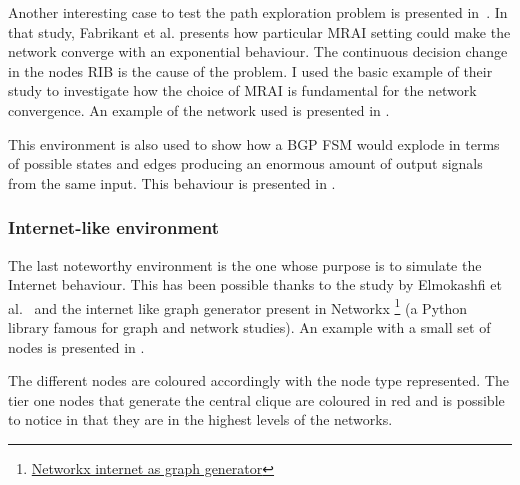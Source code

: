 Another interesting case to test the path exploration problem is 
presented in~\cite{fabrikant2011there}.
In that study, Fabrikant et al. presents how particular \ac{MRAI} setting could
make the network converge with an exponential behaviour. The continuous decision
change in the nodes \ac{RIB} is the cause of the problem.
I used the basic example of their study to investigate how the choice of \ac{MRAI}
is fundamental for the network convergence.
An example of the network used is presented in .


This environment is also used to show how a \ac{BGP} \ac{FSM} would explode
in terms of possible states and edges producing an enormous amount of
output signals from the same input.
This behaviour is presented in .

\subsubsection{Internet-like environment}
\label{subsec:internet_like_env}

The last noteworthy environment is the one whose purpose is to simulate the Internet
behaviour.
This has been possible thanks to the study by Elmokashfi et al.~\cite{elmokashfi2010scalability}
and the internet like graph generator present in Networkx \footnote{\href{https://networkx.org/documentation/stable/reference/generated/networkx.generators.internet_as_graphs.random_internet_as_graph.html\#networkx.generators.internet_as_graphs.random_internet_as_graph}{Networkx internet as graph generator}}
(a Python library famous for graph and network studies).
An example with a small set of nodes is presented in .

The different nodes are coloured accordingly with the node type represented.
The tier one nodes that generate the central clique are coloured in red and
is possible to notice in  that they are
in the highest levels of the networks.

